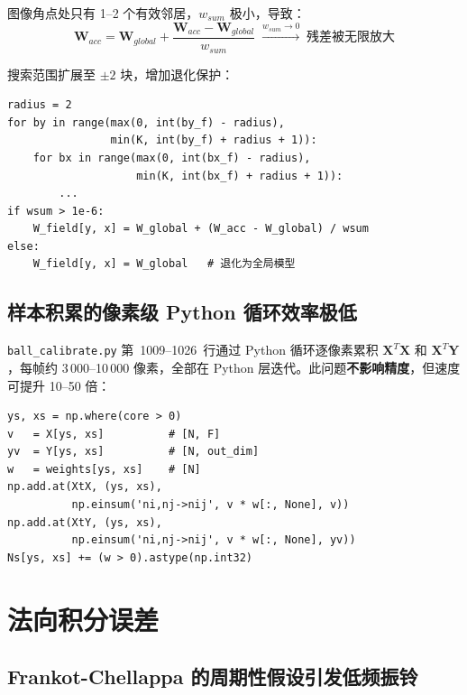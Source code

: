 图像角点处只有 1--2 个有效邻居，$w_{sum}$ 极小，导致：
\[
  \mathbf{W}_{acc}
  = \mathbf{W}_{global}
    + \frac{\mathbf{W}_{acc} - \mathbf{W}_{global}}{w_{sum}}
  \;\xrightarrow{w_{sum}\to 0}\; \text{残差被无限放大}
\]

\begin{fixbox}
搜索范围扩展至 $\pm 2$ 块，增加退化保护：

\begin{lstlisting}
radius = 2
for by in range(max(0, int(by_f) - radius),
                min(K, int(by_f) + radius + 1)):
    for bx in range(max(0, int(bx_f) - radius),
                    min(K, int(bx_f) + radius + 1)):
        ...
if wsum > 1e-6:
    W_field[y, x] = W_global + (W_acc - W_global) / wsum
else:
    W_field[y, x] = W_global   # 退化为全局模型
\end{lstlisting}
\end{fixbox}

\subsection{样本积累的像素级 Python 循环效率极低}
\label{subsec:loop}

\texttt{ball\_calibrate.py} 第~1009--1026~行通过 Python 循环逐像素累积
$\mathbf{X}^T\mathbf{X}$ 和 $\mathbf{X}^T\mathbf{Y}$，每帧约 3\,000--10\,000
像素，全部在 Python 层迭代。此问题\textbf{不影响精度}，但速度可提升 10--50 倍：

\begin{lstlisting}[caption={向量化方案（取代像素级 for 循环）}]
ys, xs = np.where(core > 0)
v   = X[ys, xs]          # [N, F]
yv  = Y[ys, xs]          # [N, out_dim]
w   = weights[ys, xs]    # [N]
np.add.at(XtX, (ys, xs),
          np.einsum('ni,nj->nij', v * w[:, None], v))
np.add.at(XtY, (ys, xs),
          np.einsum('ni,nj->nij', v * w[:, None], yv))
Ns[ys, xs] += (w > 0).astype(np.int32)
\end{lstlisting}

\section{法向积分误差}
\label{sec:integration}

\subsection{Frankot-Chellappa 的周期性假设引发低频振铃}
\label{subsec:fc_ringing}

